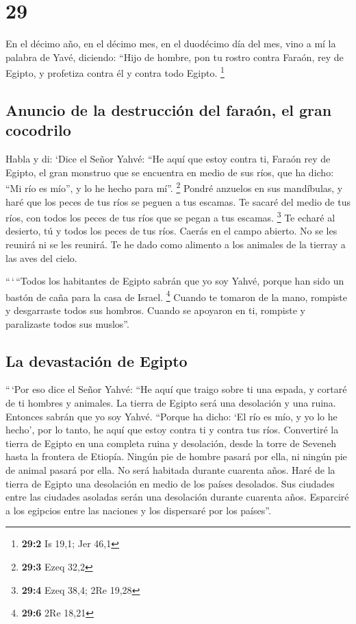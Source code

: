 \hypertarget{section-28}{%
\section{29}\label{section-28}}

 En el décimo año, en el décimo mes, en el duodécimo día
del mes, vino a mí la palabra de Yavé, diciendo:  ``Hijo
de hombre, pon tu rostro contra Faraón, rey de Egipto, y profetiza
contra él y contra todo Egipto. \footnote{\textbf{29:2} Is 19,1; Jer
  46,1}

\hypertarget{anuncio-de-la-destrucciuxf3n-del-farauxf3n-el-gran-cocodrilo}{%
\subsection{Anuncio de la destrucción del faraón, el gran
cocodrilo}\label{anuncio-de-la-destrucciuxf3n-del-farauxf3n-el-gran-cocodrilo}}

 Habla y di: `Dice el Señor Yahvé: ``He aquí que estoy
contra ti, Faraón rey de Egipto, el gran monstruo que se encuentra en
medio de sus ríos, que ha dicho: ``Mi río es mío'', y lo he hecho para
mí''. \footnote{\textbf{29:3} Ezeq 32,2}  Pondré anzuelos
en sus mandíbulas, y haré que los peces de tus ríos se peguen a tus
escamas. Te sacaré del medio de tus ríos, con todos los peces de tus
ríos que se pegan a tus escamas. \footnote{\textbf{29:4} Ezeq 38,4; 2Re
  19,28}  Te echaré al desierto, tú y todos los peces de
tus ríos. Caerás en el campo abierto. No se les reunirá ni se les
reunirá. Te he dado como alimento a los animales de la tierray a las
aves del cielo.

 ``\,`\,``Todos los habitantes de Egipto sabrán que yo soy
Yahvé, porque han sido un bastón de caña para la casa de Israel.
\footnote{\textbf{29:6} 2Re 18,21}  Cuando te tomaron de
la mano, rompiste y desgarraste todos sus hombros. Cuando se apoyaron en
ti, rompiste y paralizaste todos sus muslos''.

\hypertarget{la-devastaciuxf3n-de-egipto}{%
\subsection{La devastación de
Egipto}\label{la-devastaciuxf3n-de-egipto}}

 ``\,`Por eso dice el Señor Yahvé: ``He aquí que traigo
sobre ti una espada, y cortaré de ti hombres y animales. 
La tierra de Egipto será una desolación y una ruina. Entonces sabrán que
yo soy Yahvé. ``Porque ha dicho: `El río es mío, y yo lo he hecho',
 por lo tanto, he aquí que estoy contra ti y contra tus
ríos. Convertiré la tierra de Egipto en una completa ruina y desolación,
desde la torre de Seveneh hasta la frontera de Etiopía. 
Ningún pie de hombre pasará por ella, ni ningún pie de animal pasará por
ella. No será habitada durante cuarenta años.  Haré de la
tierra de Egipto una desolación en medio de los países desolados. Sus
ciudades entre las ciudades asoladas serán una desolación durante
cuarenta años. Esparciré a los egipcios entre las naciones y los
dispersaré por los países''.

